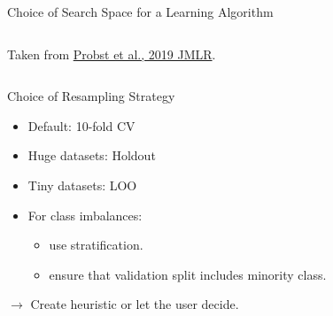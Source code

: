 \begin{frame}{Choice of Search Space for a Learning Algorithm}
\begin{columns}
\begin{column}{0.4\textwidth}
\begin{center}
{        }

        {\tiny Taken from \href{https://www.jmlr.org/papers/volume20/18-444/18-444.pdf}{Probst et al., 2019 JMLR}.}
      \end{center}
    \end{column}
  \end{columns}
\end{frame}

\begin{frame}{Choice of Resampling Strategy}
    \begin{itemize}
      \item Default: 10-fold CV
      \item Huge datasets: Holdout
      \item Tiny datasets: LOO
      \item For class imbalances:
      \begin{itemize}
        \item use stratification.
        \item ensure that validation split includes minority class.
      \end{itemize}
    \end{itemize}
    $\rightarrow$ Create heuristic or let the user decide.
\end{frame}

